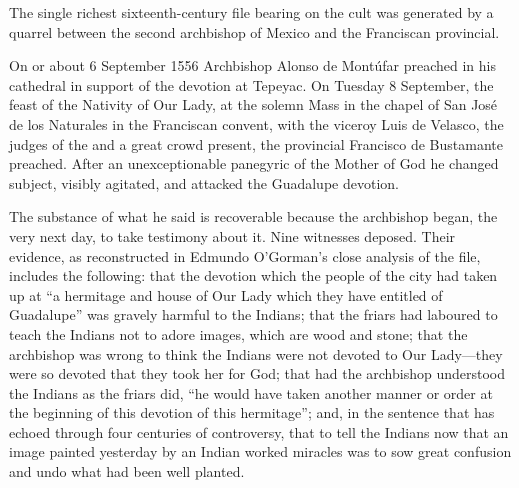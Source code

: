 The single richest sixteenth-century file bearing on the cult was
generated by a quarrel between the second archbishop of Mexico and
the Franciscan provincial.

On or about 6 September 1556 Archbishop Alonso de Mont\'ufar
preached in his cathedral in support of the devotion at Tepeyac. On
Tuesday 8 September, the feast of the Nativity of Our Lady, at the
solemn Mass in the chapel of San Jos\'e de los Naturales in the
Franciscan convent, with the viceroy Luis de Velasco, the judges of
the  and a great crowd present, the provincial
Francisco de Bustamante preached. After an unexceptionable panegyric
of the Mother of God he changed subject, visibly agitated, and
attacked the Guadalupe devotion.

The substance of what he said is recoverable because the archbishop
began, the very next day, to take testimony about it. Nine witnesses
deposed. Their evidence, as reconstructed in Edmundo O'Gorman's
close analysis of the file, includes the following: that the
devotion which the people of the city had taken up at ``a hermitage
and house of Our Lady which they have entitled of Guadalupe'' was
gravely harmful to the Indians; that the friars had laboured to teach
the Indians not to adore images, which are wood and stone; that the
archbishop was wrong to think the Indians were not devoted to Our
Lady---they were so devoted that they took her for God; that had the
archbishop understood the Indians as the friars did, ``he would have
taken another manner or order at the beginning of this devotion of
this hermitage''; and, in the sentence that has echoed through four
centuries of controversy, that to tell the Indians now that an image
painted yesterday by an Indian worked miracles was to sow great
confusion and undo what had been well planted.


